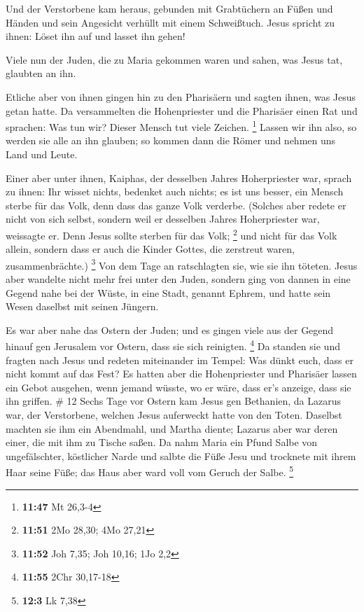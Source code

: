  Und der Verstorbene kam heraus, gebunden mit Grabtüchern
an Füßen und Händen und sein Angesicht verhüllt mit einem Schweißtuch.
Jesus spricht zu ihnen: Löset ihn auf und lasset ihn gehen!

 Viele nun der Juden, die zu Maria gekommen waren und
sahen, was Jesus tat, glaubten an ihn.

 Etliche aber von ihnen gingen hin zu den Pharisäern und
sagten ihnen, was Jesus getan hatte.  Da versammelten die
Hohenpriester und die Pharisäer einen Rat und sprachen: Was tun wir?
Dieser Mensch tut viele Zeichen. \footnote{\textbf{11:47} Mt 26,3-4}
 Lassen wir ihn also, so werden sie alle an ihn glauben;
so kommen dann die Römer und nehmen uns Land und Leute.

 Einer aber unter ihnen, Kaiphas, der desselben Jahres
Hoherpriester war, sprach zu ihnen: Ihr wisset nichts, 
bedenket auch nichts; es ist uns besser, ein Mensch sterbe für das Volk,
denn dass das ganze Volk verderbe.  (Solches aber redete
er nicht von sich selbst, sondern weil er desselben Jahres Hoherpriester
war, weissagte er. Denn Jesus sollte sterben für das Volk; \footnote{\textbf{11:51}
  2Mo 28,30; 4Mo 27,21}  und nicht für das Volk allein,
sondern dass er auch die Kinder Gottes, die zerstreut waren,
zusammenbrächte.) \footnote{\textbf{11:52} Joh 7,35; Joh 10,16; 1Jo 2,2}
 Von dem Tage an ratschlagten sie, wie sie ihn töteten.
 Jesus aber wandelte nicht mehr frei unter den Juden,
sondern ging von dannen in eine Gegend nahe bei der Wüste, in eine
Stadt, genannt Ephrem, und hatte sein Wesen daselbst mit seinen Jüngern.

 Es war aber nahe das Ostern der Juden; und es gingen
viele aus der Gegend hinauf gen Jerusalem vor Ostern, dass sie sich
reinigten. \footnote{\textbf{11:55} 2Chr 30,17-18}  Da
standen sie und fragten nach Jesus und redeten miteinander im Tempel:
Was dünkt euch, dass er nicht kommt auf das Fest?  Es
hatten aber die Hohenpriester und Pharisäer lassen ein Gebot ausgehen,
wenn jemand wüsste, wo er wäre, dass er's anzeige, dass sie ihn griffen.
\# 12  Sechs Tage vor Ostern kam Jesus gen Bethanien, da
Lazarus war, der Verstorbene, welchen Jesus auferweckt hatte von den
Toten.  Daselbst machten sie ihm ein Abendmahl, und Martha
diente; Lazarus aber war deren einer, die mit ihm zu Tische saßen.
 Da nahm Maria ein Pfund Salbe von ungefälschter,
köstlicher Narde und salbte die Füße Jesu und trocknete mit ihrem Haar
seine Füße; das Haus aber ward voll vom Geruch der Salbe. \footnote{\textbf{12:3}
  Lk 7,38}

